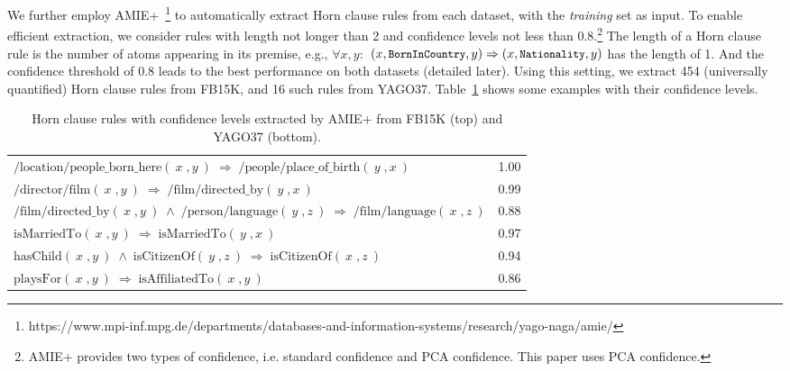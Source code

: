 \documentclass[letterpaper]{article} \usepackage{aaai18}  \usepackage{times}  \usepackage{helvet}  \usepackage{courier}  \usepackage{url}  \usepackage{graphicx}  \usepackage{amsmath}
\begin{document}
We further employ AMIE+~\cite{galarraga2015:AMIE+}\footnote{https://www.mpi-inf.mpg.de/departments/databases-and-information-systems/research/yago-naga/amie/} to automatically extract Horn clause rules from each dataset, with the \textit{training} set as input. To enable efficient extraction, we consider rules with length not longer than 2 and confidence levels not less than 0.8.\footnote{AMIE+ provides two types of confidence, i.e. standard confidence and PCA confidence. This paper uses PCA confidence.} The length of a Horn clause rule is the number of atoms appearing in its premise, e.g., $\forall x, y:$ $(x, \texttt{\small BornInCountry}, y) \Rightarrow (x, \texttt{\small Nationality}, y)$ has the length of 1. And the confidence threshold of 0.8 leads to the best performance on both datasets (detailed later). Using this setting, we extract 454 (universally quantified) Horn clause rules from FB15K, and 16 such rules from YAGO37. Table~\ref{tab:Rules} shows some examples with their confidence levels.

\begin{table}[t]
    \centering\scriptsize
    \caption{\label{tab:Rules} Horn clause rules with confidence levels extracted by AMIE+ from FB15K (top) and YAGO37 (bottom).}
    \begin{tabular*}{0.47 \textwidth}{@{\extracolsep{\fill}}@{}lc@{}}
        \toprule
        $\textrm{/location/people\_born\_here}(\!\!\:x\!\!\;,\!y\!\!\:) \!\!\!\;\Rightarrow\!\!\!\; \textrm{/people/place\_of\_birth}(\!\!\:y\!\!\;,\!x\!\!\:)$                    & 1.00 \\
        $\textrm{/director/film}(\!\!\:x\!\!\;,\!y\!\!\:) \!\!\!\;\Rightarrow\!\!\!\; \textrm{/film/directed\_by}(\!\!\:y\!\!\;,\!x\!\!\:)$                                        & 0.99 \\
        $\textrm{/film/directed\_by}(\!\!\:x\!\!\;,\!y\!\!\:) \!\!\!\;\wedge\!\!\!\; \textrm{/person/language}(\!\!\:y\!\!\;,\!z\!\!\:) \!\!\!\;\Rightarrow\!\!\!\; \textrm{/film/language}(\!\!\:x\!\!\;,\!z\!\!\:)$ & 0.88 \\
        \midrule
        $\textrm{isMarriedTo}(\!\!\:x\!\!\;,\!y\!\!\:) \!\!\!\;\Rightarrow\!\!\!\; \textrm{isMarriedTo}(\!\!\:y\!\!\;,\!x\!\!\:)$                                                  & 0.97 \\
        $\textrm{hasChild}(\!\!\:x\!\!\;,\!y\!\!\:) \!\!\!\;\wedge\!\!\!\; \textrm{isCitizenOf}(\!\!\:y\!\!\;,\!z\!\!\:) \!\!\!\;\Rightarrow\!\!\!\; \textrm{isCitizenOf}(\!\!\:x\!\!\;,\!z\!\!\:)$    & 0.94 \\
        $\textrm{playsFor}(\!\!\:x\!\!\;,\!y\!\!\:) \!\!\!\;\Rightarrow\!\!\!\; \textrm{isAffiliatedTo}(\!\!\:x\!\!\;,\!y\!\!\:)$                                                  & 0.86 \\
        \bottomrule
    \end{tabular*}
\end{table}
\end{document}
